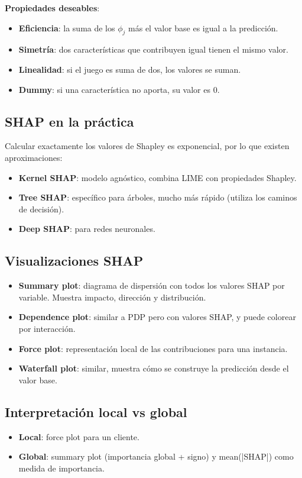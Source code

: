 \documentclass[12pt,a4paper,openany,oneside]{book}
\begin{document}
\textbf{Propiedades deseables}:
\begin{itemize}
    \item \textbf{Eficiencia}: la suma de los \(\phi_j\) más el valor base es igual a la predicción.
    \item \textbf{Simetría}: dos características que contribuyen igual tienen el mismo valor.
    \item \textbf{Linealidad}: si el juego es suma de dos, los valores se suman.
    \item \textbf{Dummy}: si una característica no aporta, su valor es 0.
\end{itemize}

\subsection{SHAP en la práctica}
Calcular exactamente los valores de Shapley es exponencial, por lo que existen aproximaciones:
\begin{itemize}
    \item \textbf{Kernel SHAP}: modelo agnóstico, combina LIME con propiedades Shapley.
    \item \textbf{Tree SHAP}: específico para árboles, mucho más rápido (utiliza los caminos de decisión).
    \item \textbf{Deep SHAP}: para redes neuronales.
\end{itemize}

\subsection{Visualizaciones SHAP}
\begin{itemize}
    \item \textbf{Summary plot}: diagrama de dispersión con todos los valores SHAP por variable. Muestra impacto, dirección y distribución.
    \item \textbf{Dependence plot}: similar a PDP pero con valores SHAP, y puede colorear por interacción.
    \item \textbf{Force plot}: representación local de las contribuciones para una instancia.
    \item \textbf{Waterfall plot}: similar, muestra cómo se construye la predicción desde el valor base.
\end{itemize}

\subsection{Interpretación local vs global}
\begin{itemize}
    \item \textbf{Local}: force plot para un cliente.
    \item \textbf{Global}: summary plot (importancia global + signo) y mean(|SHAP|) como medida de importancia.
\end{itemize}
\end{document}
